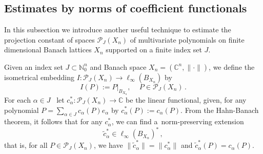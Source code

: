 \documentclass[12pt]{amsart}
\numberwithin{subsection}{section}
\theoremstyle{definition}
\theoremstyle{remark}
\begin{document}
\subsection{Estimates by norms of coefficient functionals} \label{Part: Polynomial projection constants}

In this subsection we introduce another useful technique to estimate the projection constant of spaces $\mathcal{P}_J(X_n)$
of multivariate polynomials on finite dimensional Banach lattices $X_n$ supported on a finite index set $J$.

Given an index set $J \subset \mathbb{N}_0^n$ and Banach space $X_n = (\mathbb{C}^n,\|\cdot\|)$, we  define the isometrical
embedding $I \colon \mathcal{P}_{J}(X_n) \to \ell_\infty(B_{X_n})$ by
\[
I(P) := P|_{B_{X_n}}, \quad\, P\in \mathcal{P}_{J}(X_n)\,.
\]
For each $\alpha \in J$ \, let $c_{\alpha}^{*}  \colon \mathcal{P}_J(X_n) \to \mathbb{C}$ be the linear functional, given, for
any polynomial $P = \sum_{\alpha \in J} c_\alpha(P) e_\alpha$ by $c_{\alpha}^{*}(P) := c_{\alpha}(P)$. From the Hahn-Banach
theorem, it follows that for any $c_{\alpha}^{*}$, we can find a~norm-preserving extension
\[
\widetilde{c}_{\alpha}^{*} \in \ell_\infty(B_{X_n})^{*}\,,
\]
that is, for all $P\in \mathcal{P}_{J}(X_n)$, we have $\|\widetilde{c}_{\alpha}^{*}\| = \|c_{\alpha}^{*}\|$
and $\widetilde{c}_{\alpha}^{*}(P)= c_\alpha(P)$.
\end{document}
